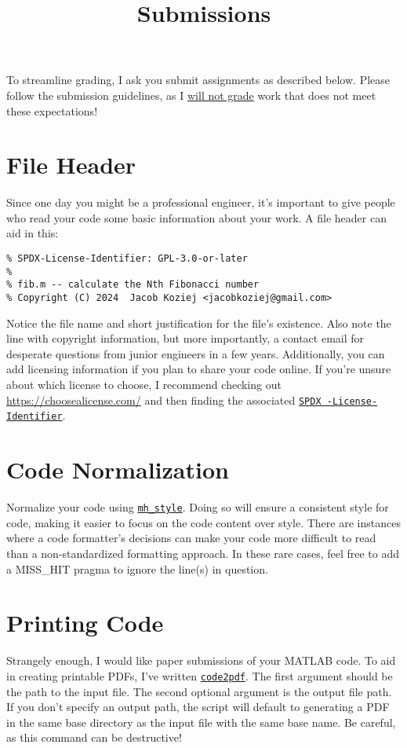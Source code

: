 \documentclass{article}
\title{Submissions}
\begin{document}
\renderTitle

\noindent
To streamline grading, I ask you submit assignments as described below.
Please follow the submission guidelines, as I \underline{will not grade}
work that does not meet these expectations!

\section{File Header}

Since one day you might be a professional engineer, it's important to
give people who read your code some basic information about your work. A
file header can aid in this:

\begin{verbatim}
% SPDX-License-Identifier: GPL-3.0-or-later
%
% fib.m -- calculate the Nth Fibonacci number
% Copyright (C) 2024  Jacob Koziej <jacobkoziej@gmail.com>
\end{verbatim}

\noindent
Notice the file name and short justification for the file's existence.
Also note the line with copyright information, but more importantly, a
contact email for desperate questions from junior engineers in a few
years.  Additionally, you can add licensing information if you plan to
share your code online.  If you're unsure about which license to choose,
I recommend checking out \url{https://choosealicense.com/} and then
finding the associated \href{https://spdx.org/licenses/}{\texttt{SPDX%
-License-Identifier}}.

\section{Code Normalization}

Normalize your code using \href{https://florianschanda.github.io/%
miss_hit/style_checker.html}{\texttt{mh\_style}}.  Doing so will ensure
a consistent style for code, making it easier to focus on the code
content over style.  There are instances where a code formatter's
decisions can make your code more difficult to read than a
non-standardized formatting approach.  In these rare cases, feel free to
add a MISS\_HIT pragma to ignore the line(s) in question.

\section{Printing Code}

Strangely enough, I would like paper submissions of your MATLAB code.
To aid in creating printable PDFs, I've written \href{https://github.%
com/jacobkoziej/jk-ece210/blob/master/bin/code2pdf}{\texttt{code2pdf}}.
The first argument should be the path to the input file.  The second
optional argument is the output file path.  If you don't specify an
output path, the script will default to generating a PDF in the same
base directory as the input file with the same base name.  Be careful,
as this command can be destructive!
\end{document}
